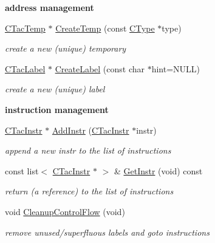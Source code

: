 \begin{Indent}{\bf address management}\par
\begin{DoxyCompactItemize}
\item 
\hyperlink{classCTacTemp}{C\-Tac\-Temp} $\ast$ \hyperlink{classCCodeBlock_a4b3f04f46fa17b260cf56c2b672eecf5}{Create\-Temp} (const \hyperlink{classCType}{C\-Type} $\ast$type)
\begin{DoxyCompactList}\small\item\em create a new (unique) temporary \end{DoxyCompactList}\item 
\hyperlink{classCTacLabel}{C\-Tac\-Label} $\ast$ \hyperlink{classCCodeBlock_ae09ac91b8c184224a789fe5ef70b5c35}{Create\-Label} (const char $\ast$hint=N\-U\-L\-L)
\begin{DoxyCompactList}\small\item\em create a new (unique) label \end{DoxyCompactList}\end{DoxyCompactItemize}
\end{Indent}
\begin{Indent}{\bf instruction management}\par
\begin{DoxyCompactItemize}
\item 
\hyperlink{classCTacInstr}{C\-Tac\-Instr} $\ast$ \hyperlink{classCCodeBlock_a9833718d3ccb6905a83ee0f6e824c0ab}{Add\-Instr} (\hyperlink{classCTacInstr}{C\-Tac\-Instr} $\ast$instr)
\begin{DoxyCompactList}\small\item\em append a new {\itshape instr} to the list of instructions \end{DoxyCompactList}\item 
\hypertarget{classCCodeBlock_afe4a8b4f8014a287d6613637498d952d}{const list$<$ \hyperlink{classCTacInstr}{C\-Tac\-Instr} $\ast$ $>$ \& \hyperlink{classCCodeBlock_afe4a8b4f8014a287d6613637498d952d}{Get\-Instr} (void) const }\label{classCCodeBlock_afe4a8b4f8014a287d6613637498d952d}

\begin{DoxyCompactList}\small\item\em return (a reference) to the list of instructions \end{DoxyCompactList}\item 
\hypertarget{classCCodeBlock_a32734e75b8fd4dc1745461fdee03c0de}{void \hyperlink{classCCodeBlock_a32734e75b8fd4dc1745461fdee03c0de}{Cleanup\-Control\-Flow} (void)}\label{classCCodeBlock_a32734e75b8fd4dc1745461fdee03c0de}

\begin{DoxyCompactList}\small\item\em remove unused/superfluous labels and goto instructions \end{DoxyCompactList}\end{DoxyCompactItemize}
\end{Indent}
